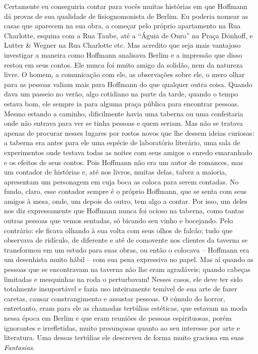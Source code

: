 Certamente eu conseguiria contar para vocês muitas histórias em que
Hoffmann dá provas de sua qualidade de fisiognomonista de Berlim. Eu
poderia nomear as casas que aparecem na sua obra, a começar pelo próprio
apartamento na Rua Charlotte, esquina com a Rua Taube, até a ``Águia de
Ouro'' na Praça Dönhoff, e Lutter \& Wegner na Rua Charlotte etc. Mas
acredito que seja mais vantajoso investigar a maneira como Hoffmann
analisava Berlim e a impressão que disso restou em seus contos. Ele
nunca foi muito amigo da solidão, nem da natureza livre. O homem, a
comunicação com ele, as observações sobre ele, o mero olhar para as
pessoas valiam mais para Hoffmann do que qualquer outra coisa. Quando
dava um passeio no verão, algo cotidiano na parte da tarde, quando o
tempo estava bom, ele sempre ia para alguma praça pública para encontrar
pessoas. Mesmo estando a caminho, dificilmente havia uma taberna ou uma
confeitaria onde não entrava para ver se tinha pessoas e quem seriam.
Mas não se tratava apenas de procurar nesses lugares por rostos novos
que lhe dessem ideias curiosas: a taberna era antes para ele uma espécie
de laboratório literário, uma sala de experimentos onde testava todas as
noites com seus amigos o enredo emaranhado e os efeitos de seus contos.
Pois Hoffmann não era um autor de romances, mas um contador de histórias
e, até nos livros, muitas delas, talvez a maioria, apresentam um
personagem em cuja boca as coloca para serem contadas. No fundo, claro,
esse contador sempre é o próprio Hoffmann, que se senta com seus amigos
à mesa, onde, um depois do outro, tem algo a contar. Por isso, um deles
nos diz expressamente que Hoffmann nunca foi ocioso na taberna, como
tantas outras pessoas que vemos sentadas, só bicando seu vinho e
bocejando. Pelo contrário: ele ficava olhando à sua volta com seus olhos
de falcão; tudo que observava de ridículo, de diferente e até de
comovente nos clientes da taverna se transformou em um estudo para suas
obras, ou então o colocava -- Hoffmann era um desenhista muito hábil --
com sua pena expressiva no papel. Mas aí quando as pessoas que se
encontravam na taverna não lhe eram agradáveis; quando cabeças limitadas
e mesquinhas na roda o perturbavam! Nesses casos, ele deve ter sido
totalmente insuportável e fazia uso inteiramente temível de sua arte de
fazer caretas, causar constrangimento e assustar pessoas. O cúmulo do
horror, entretanto, eram para ele as chamadas tertúlias estéticas, que
estavam na moda nessa época em Berlim e que eram reuniões de pessoas
espirituosas, porém ignorantes e irrefletidas, muito presunçosas quanto
ao seu interesse por arte e literatura. Uma dessas tertúlias ele
descreveu de forma muito graciosa em suas \emph{Fantasias}.

